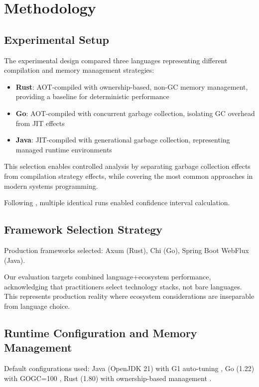 \documentclass{article}
\begin{document}
\section{Methodology}
\label{sec:methodology}

\subsection{Experimental Setup}

The experimental design compared three languages representing different compilation and memory management strategies:

\begin{itemize}
    \item \textbf{Rust}: AOT-compiled with ownership-based, non-GC memory management, providing a baseline for deterministic performance
    \item \textbf{Go}: AOT-compiled with concurrent garbage collection, isolating GC overhead from JIT effects
    \item \textbf{Java}: JIT-compiled with generational garbage collection, representing managed runtime environments
\end{itemize}

This selection enables controlled analysis by separating garbage collection effects from compilation strategy effects, while covering the most common approaches in modern systems programming.

Following \citep{kalibera2013rigorous}, multiple identical runs enabled confidence interval calculation.

\subsection{Framework Selection Strategy}

Production frameworks selected: Axum (Rust), Chi (Go), Spring Boot WebFlux (Java).

Our evaluation targets combined language+ecosystem performance, acknowledging that practitioners select technology stacks, not bare languages. This represents production reality where ecosystem considerations are inseparable from language choice.

\subsection{Runtime Configuration and Memory Management}

Default configurations used: Java (OpenJDK 21) with G1 auto-tuning \citep{oracle2023gctuning}, Go (1.22) with GOGC=100 \citep{goteam2023gcguide}, Rust (1.80) with ownership-based management \citep{rustteam2023ownership}.
\end{document}
